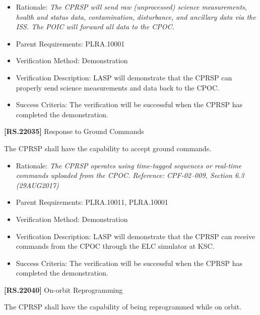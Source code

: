 \documentclass[12pt,oneside,oldfontcommands]{memoir}
\begin{document}
\begin{itemize}
\item{} Rationale: \emph{The CPRSP will send raw (unprocessed) science measurements, health and status data, contamination, disturbance, and ancillary data via the ISS. The POIC will forward all data to the CPOC.}

\item{} Parent Requirements: PLRA.10001

\item{} Verification Method: Demonstration

\item{} Verification Description: \gls{LASP} will demonstrate that the \gls{CPRSP} can properly send science \gls{measure}ments and data back to the \gls{CPOC}.

\item{} Success Criteria: The verification will be successful when the \gls{CPRSP} has completed the \gls{demonstration}.

\end{itemize}

\textbf{[RS.22035]} Response to Ground Commands

The \gls{CPRSP} shall have the capability to accept ground commands.

\begin{itemize}
\item{} Rationale: \emph{The CPRSP operates using time-tagged sequences or real-time commands uploaded from the CPOC. Reference: CPF-02--009, Section 6.3 (29AUG2017)}

\item{} Parent Requirements: PLRA.10011, PLRA.10001

\item{} Verification Method: Demonstration

\item{} Verification Description: \gls{LASP} will demonstrate that the \gls{CPRSP} can receive commands from the \gls{CPOC} through the \gls{ELC} simulator at \gls{KSC}.

\item{} Success Criteria: The verification will be successful when the \gls{CPRSP} has completed the \gls{demonstration}.

\end{itemize}

\textbf{[RS.22040]} On-orbit Reprogramming

The \gls{CPRSP} shall have the capability of being reprogrammed while on orbit.
\end{document}
